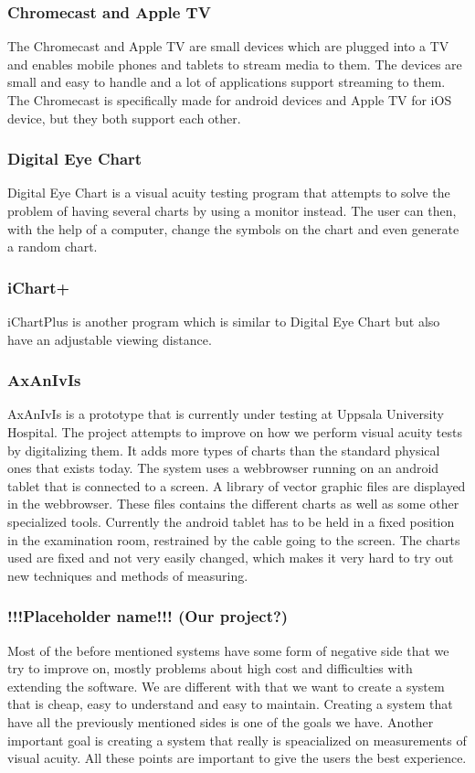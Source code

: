 \documentclass[12pt,a4paper,notitlepage]{report}
\begin{document}
\subsubsection{Chromecast and Apple TV}
The Chromecast \cite{chromecast} and Apple TV \cite{appletv} are small devices which are plugged into a TV and enables mobile phones and tablets to stream media to them. The devices are small and easy to handle and a lot of applications support streaming to them. The Chromecast is specifically made for android devices and Apple TV for iOS device, but they both support each other.

\subsubsection{Digital Eye Chart}
 Digital Eye Chart is a visual acuity testing program that attempts to solve the problem of having several charts by using a monitor instead. The user can then, with the help of a computer, change the symbols on the chart and even generate a random chart. \cite{digitaleyechart}

\subsubsection{iChart+}
iChartPlus is another program which is similar to Digital Eye Chart but also have an adjustable viewing distance. \cite{ichartplus}

\subsubsection{AxAnIvIs}
AxAnIvIs is a prototype that is currently under testing at Uppsala University Hospital. The project attempts to improve on how we perform visual acuity tests by digitalizing them. It adds more types of charts than the standard physical ones that exists today. The system uses a webbrowser running on an android tablet that is connected to a screen. A library of vector graphic files are displayed in the webbrowser. These files contains the different charts as well as some other specialized tools. Currently the android tablet has to be held in a fixed position in the examination room, restrained by the cable going to the screen. The charts used are fixed and not very easily changed, which makes it very hard to try out new techniques and methods of measuring.

\subsubsection{!!!Placeholder name!!! (Our project?)} %
Most of the before mentioned systems have some form of negative side that we try to improve on, mostly problems about high cost and difficulties with extending the software. We are different with that we want to create a system that is cheap, easy to understand and easy to maintain. Creating a system that have all the previously mentioned sides is one of the goals we have. Another important goal is creating a system that really is speacialized on measurements of visual acuity. All these points are important to give the users the best experience.
\end{document}
